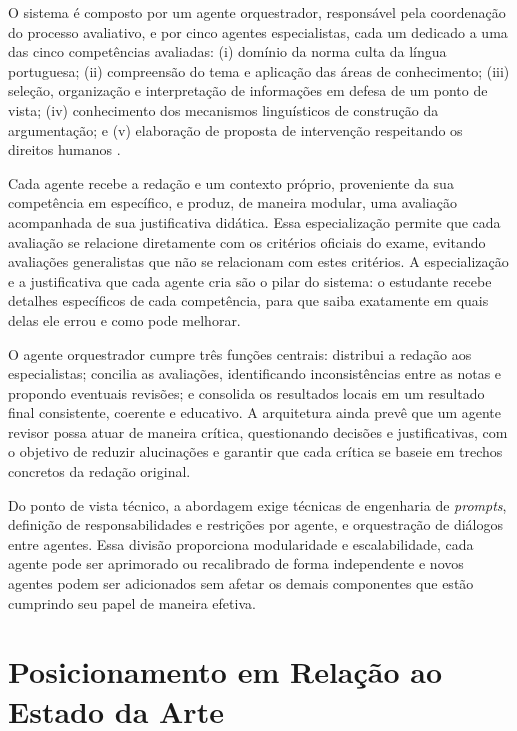 \documentclass[12pt]{article}
\begin{document}
O sistema é composto por um agente orquestrador, responsável pela coordenação do processo avaliativo, e por cinco agentes especialistas, cada um dedicado a uma das cinco competências avaliadas: (i) domínio da norma culta da língua portuguesa; (ii) compreensão do tema e aplicação das áreas de conhecimento; (iii) seleção, organização e interpretação de informações em defesa de um ponto de vista; (iv) conhecimento dos mecanismos linguísticos de construção da argumentação; e (v) elaboração de proposta de intervenção respeitando os direitos humanos \cite{matrizReferencia}.

Cada agente recebe a redação e um contexto próprio, proveniente da sua competência em específico, e produz, de maneira modular, uma avaliação acompanhada de sua justificativa didática. Essa especialização permite que cada avaliação se relacione diretamente com os critérios oficiais do exame, evitando avaliações generalistas que não se relacionam com estes critérios. A especialização e a justificativa que cada agente cria são o pilar do sistema: o estudante recebe detalhes específicos de cada competência, para que saiba exatamente em quais delas ele errou e como pode melhorar.

O agente orquestrador cumpre três funções centrais: distribui a redação aos especialistas; concilia as avaliações, identificando inconsistências entre as notas e propondo eventuais revisões; e consolida os resultados locais em um resultado final consistente, coerente e educativo. A arquitetura ainda prevê que um agente revisor possa atuar de maneira crítica, questionando decisões e justificativas, com o objetivo de reduzir alucinações e garantir que cada crítica se baseie em trechos concretos da redação original.

Do ponto de vista técnico, a abordagem exige técnicas de engenharia de \textit{prompts}, definição de responsabilidades e restrições por agente, e orquestração de diálogos entre agentes. Essa divisão proporciona modularidade e escalabilidade, cada agente pode ser aprimorado ou recalibrado de forma independente e novos agentes podem ser adicionados sem afetar os demais componentes que estão cumprindo seu papel de maneira efetiva.
\newpage

\section{Posicionamento em Relação ao Estado da Arte}
\label{sec:estado_da_arte}
\end{document}
